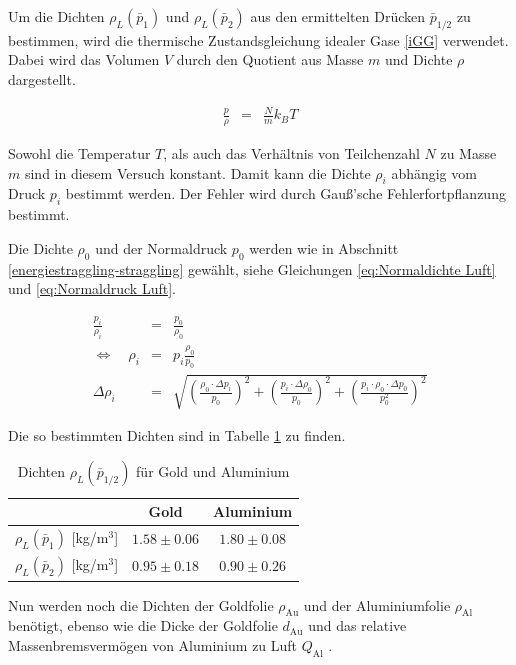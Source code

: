 \documentclass[12pt,a4paper]{scrartcl}
\numberwithin{equation}{section} %
\begin{document}
\noindent
Um die Dichten $\rho_L(\bar{p}_1)$ und $\rho_L(\bar{p}_2)$ aus den ermittelten Drücken $\bar{p}_{1/2}$ zu bestimmen, wird die thermische Zustandsgleichung idealer Gase \eqref{iGG} verwendet. Dabei wird das Volumen $V$ durch den Quotient aus Masse $m$ und Dichte $\rho$ dargestellt.

\begin{eqnarray}
	\frac{p}{\rho} &=& \frac{N}{m} k_B T
\end{eqnarray}

\noindent
Sowohl die Temperatur $T$, als auch das Verhältnis von Teilchenzahl $N$ zu Masse $m$ sind in diesem Versuch konstant. Damit kann die Dichte $\rho_i$ abhängig vom Druck $p_i$ bestimmt werden. Der Fehler wird durch Gauß'sche Fehlerfortpflanzung bestimmt.

Die Dichte $\rho_0$ und der Normaldruck $p_0$ werden wie in Abschnitt \ref{energiestraggling-straggling} gewählt, siehe Gleichungen \eqref{eq:Normaldichte Luft} und \eqref{eq:Normaldruck Luft}. \cite{DWD}

\begin{eqnarray}
	\frac{p_i}{\rho_i} &=& \frac{p_0}{\rho_0} \\
	\Leftrightarrow \quad \rho_i &=& p_i \frac{\rho_0}{p_0} \\
	\Delta \rho_i &=& \sqrt{\left(\frac{\rho_0 \cdot \Delta p_i}{p_0}\right)^2 + \left(\frac{p_i \cdot \Delta \rho_0}{p_0}\right)^2 + \left(\frac{p_i \cdot \rho_0 \cdot \Delta p_0}{p_0^2}\right)^2}
\end{eqnarray}

\noindent
Die so bestimmten Dichten sind in Tabelle \ref{table_dichten} zu finden.

\begin{table}[h!]
	\centering
	\begin{tabular}{||c||c|c||}
		\hline
		& Gold & Aluminium \\
		\hline \hline
		$\rho_L(\bar{p}_1)$ [kg/m$^3$] & $1.58 \pm 0.06$ & $1.80 \pm 0.08$ \\
		\hline
		$\rho_L(\bar{p}_2)$ [kg/m$^3$] & $0.95 \pm 0.18$ & $0.90 \pm 0.26$ \\
		\hline
	\end{tabular}
	\caption{Dichten $\rho_L(\bar{p}_{1/2})$ für Gold und Aluminium}
	\label{table_dichten}
\end{table}

Nun werden noch die Dichten der Goldfolie $\rho_\mathrm{Au}$ \cite{DichteGold} und der Aluminiumfolie $\rho_\mathrm{Al}$ \cite{DichteAlu} benötigt, ebenso wie die Dicke der Goldfolie $d_\mathrm{Au}$ \cite{Uni} und das relative Massenbremsvermögen von Aluminium zu Luft $Q_\mathrm{Al}$ \cite{Uni}.
\end{document}
